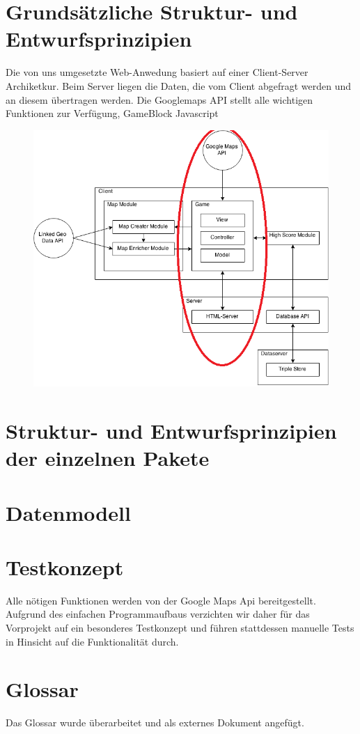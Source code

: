 \documentclass[11pt,a4paper]{article}
\begin{document}
\section{Grundsätzliche Struktur- und Entwurfsprinzipien}
Die von uns umgesetzte Web-Anwedung basiert auf einer Client-Server Archiketkur.  Beim Server liegen die Daten, die vom Client abgefragt werden und an diesem übertragen werden. Die Googlemaps API stellt alle wichtigen Funktionen zur Verfügung, GameBlock Javascript 
\begin{figure}[htb]
  \centering
  \includegraphics[scale=0.5]{arch.png}
  \label{PNFs}
\end{figure} 



\section{Struktur- und Entwurfsprinzipien der einzelnen Pakete}
\section{Datenmodell}
 
\section{Testkonzept}
Alle nötigen Funktionen werden von der Google Maps Api bereitgestellt.
Aufgrund des einfachen Programmaufbaus verzichten wir daher für das Vorprojekt auf ein besonderes Testkonzept und führen stattdessen manuelle Tests in Hinsicht auf die Funktionalität durch.
\section{Glossar}
Das Glossar wurde überarbeitet und als externes Dokument angefügt.
\end{document}
